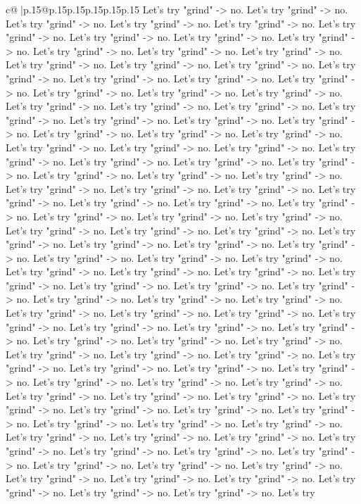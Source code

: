 \documentclass{article}
\begin{document}
{\begin{supertabular}{c@{$\;$}|p{.15\linewidth}@{}p{.15\linewidth}p{.15\linewidth}p{.15\linewidth}p{.15\linewidth}p{.15\linewidth}}
{{{Let's try "grind" {-}> no. Let's try "grind" {-}> no. Let's try "grind" {-}> no. Let's try "grind" {-}> no. Let's try "grind" {-}> no. Let's try "grind" {-}> no. Let's try "grind" {-}> no. Let's try "grind" {-}> no. Let's try "grind" {-}> no. Let's try "grind" {-}> no. Let's try "grind" {-}> no. Let's try "grind" {-}> no. Let's try "grind" {-}> no. Let's try "grind" {-}> no. Let's try "grind" {-}> no. Let's try "grind" {-}> no. Let's try "grind" {-}> no. Let's try "grind" {-}> no. Let's try "grind" {-}> no. Let's try "grind" {-}> no. Let's try "grind" {-}> no. Let's try "grind" {-}> no. Let's try "grind" {-}> no. Let's try "grind" {-}> no. Let's try "grind" {-}> no. Let's try "grind" {-}> no. Let's try "grind" {-}> no. Let's try "grind" {-}> no. Let's try "grind" {-}> no. Let's try "grind" {-}> no. Let's try "grind" {-}> no. Let's try "grind" {-}> no. Let's try "grind" {-}> no. Let's try "grind" {-}> no. Let's try "grind" {-}> no. Let's try "grind" {-}> no. Let's try "grind" {-}> no. Let's try "grind" {-}> no. Let's try "grind" {-}> no. Let's try "grind" {-}> no. Let's try "grind" {-}> no. Let's try "grind" {-}> no. Let's try "grind" {-}> no. Let's try "grind" {-}> no. Let's try "grind" {-}> no. Let's try "grind" {-}> no. Let's try "grind" {-}> no. Let's try "grind" {-}> no. Let's try "grind" {-}> no. Let's try "grind" {-}> no. Let's try "grind" {-}> no. Let's try "grind" {-}> no. Let's try "grind" {-}> no. Let's try "grind" {-}> no. Let's try "grind" {-}> no. Let's try "grind" {-}> no. Let's try "grind" {-}> no. Let's try "grind" {-}> no. Let's try "grind" {-}> no. Let's try "grind" {-}> no. Let's try "grind" {-}> no. Let's try "grind" {-}> no. Let's try "grind" {-}> no. Let's try "grind" {-}> no. Let's try "grind" {-}> no. Let's try "grind" {-}> no. Let's try "grind" {-}> no. Let's try "grind" {-}> no. Let's try "grind" {-}> no. Let's try "grind" {-}> no. Let's try "grind" {-}> no. Let's try "grind" {-}> no. Let's try "grind" {-}> no. Let's try "grind" {-}> no. Let's try "grind" {-}> no. Let's try "grind" {-}> no. Let's try "grind" {-}> no. Let's try "grind" {-}> no. Let's try "grind" {-}> no. Let's try "grind" {-}> no. Let's try "grind" {-}> no. Let's try "grind" {-}> no. Let's try "grind" {-}> no. Let's try "grind" {-}> no. Let's try "grind" {-}> no. Let's try "grind" {-}> no. Let's try "grind" {-}> no. Let's try "grind" {-}> no. Let's try "grind" {-}> no. Let's try "grind" {-}> no. Let's try "grind" {-}> no. Let's try "grind" {-}> no. Let's try "grind" {-}> no. Let's try "grind" {-}> no. Let's try "grind" {-}> no. Let's try "grind" {-}> no. Let's try "grind" {-}> no. Let's try "grind" {-}> no. Let's try "grind" {-}> no. Let's try "grind" {-}> no. Let's try "grind" {-}> no. Let's try "grind" {-}> no. Let's try "grind" {-}> no. Let's try "grind" {-}> no. Let's try "grind" {-}> no. Let's try "grind" {-}> no. Let's try "grind" {-}> no. Let's try "grind" {-}> no. Let's try "grind" {-}> no. Let's try "grind" {-}> no. Let's try "grind" {-}> no. Let's try "grind" {-}> no. Let's try "grind" {-}> no. Let's try "grind" {-}> no. Let's try "grind" {-}> no. Let's try "grind" {-}> no. Let's try "grind" {-}> no. Let's try "grind" {-}> no. Let's try }}}
\end{supertabular}}
\end{document}
